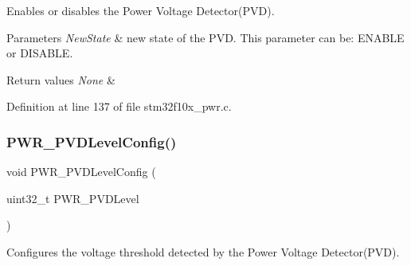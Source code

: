 Enables or disables the Power Voltage Detector(\+P\+V\+D). 


\begin{DoxyParams}{Parameters}
{\em New\+State} & new state of the P\+VD. This parameter can be\+: E\+N\+A\+B\+LE or D\+I\+S\+A\+B\+LE. \\
\hline
\end{DoxyParams}

\begin{DoxyRetVals}{Return values}
{\em None} & \\
\hline
\end{DoxyRetVals}


Definition at line 137 of file stm32f10x\+\_\+pwr.\+c.

\mbox{\label{group___p_w_r___private___functions_ga237c143ef6aa55abb8049fa7bf24ab8f}} 
\subsubsection{\texorpdfstring{P\+W\+R\+\_\+\+P\+V\+D\+Level\+Config()}{PWR\_PVDLevelConfig()}}
{\footnotesize\ttfamily void P\+W\+R\+\_\+\+P\+V\+D\+Level\+Config (\begin{DoxyParamCaption}\item[{uint32\+\_\+t}]{P\+W\+R\+\_\+\+P\+V\+D\+Level }\end{DoxyParamCaption})}



Configures the voltage threshold detected by the Power Voltage Detector(\+P\+V\+D). 


